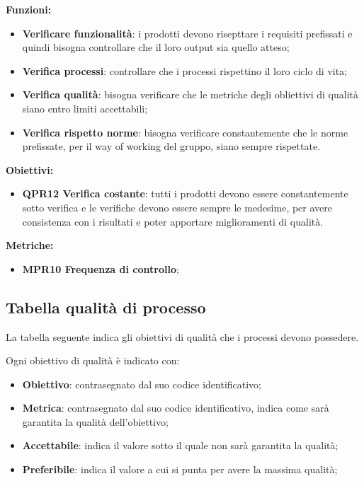 \documentclass[../piano_di_qualifica.tex]{subfiles}
\begin{document}
\textbf{Funzioni:}
\smallbreak
\begin{itemize}
	\item \textbf{Verificare funzionalità}:  i prodotti devono risepttare i requisiti prefissati e quindi bisogna controllare che il loro output sia quello atteso;
	\item \textbf{Verifica processi}:  controllare che i processi rispettino il loro ciclo di vita;
	\item \textbf{Verifica qualità}:  bisogna verificare che le metriche degli obliettivi di qualità siano entro limiti accettabili;
	\item \textbf{Verifica rispetto norme}: bisogna verificare constantemente che le norme prefissate, per il way of working del gruppo, siano sempre rispettate.
\end{itemize}

\textbf{Obiettivi:}
\smallbreak
\begin{itemize}
	\item \textbf{QPR12 Verifica costante}: tutti i prodotti devono essere constantemente sotto verifica e le verifiche devono essere sempre le medesime, per avere consistenza con i risultati e poter apportare miglioramenti di qualità.
\end{itemize}

\textbf{Metriche:}
\smallbreak
\begin{itemize}
	\item \textbf{MPR10 Frequenza di controllo};
\end{itemize}

\subsection{Tabella qualità di processo}
La tabella seguente indica gli obiettivi di qualità che i processi devono possedere.

Ogni obiettivo di qualità è indicato con:
\smallbreak
\begin{itemize}
	\item \textbf{Obiettivo}: contrasegnato dal suo codice identificativo;
	\item \textbf{Metrica}: contrasegnato dal suo codice identificativo, indica come sarà garantita la qualità dell'obiettivo;
	\item \textbf{Accettabile}: indica il valore sotto il quale non sarà garantita la qualità;
	\item \textbf{Preferibile}: indica il valore a cui si punta per avere la massima qualità;
\end{itemize}
\end{document}
